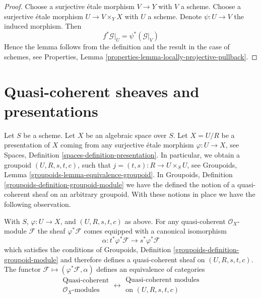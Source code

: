 \begin{proof}
Choose a surjective \'etale morphism $V \to Y$ with $V$ a scheme.
Choose a surjective \'etale morphism $U \to V \times_Y X$ with
$U$ a scheme. Denote $\psi : U \to V$ the induced morphism.
Then
$$
f^*\mathcal{G}|_U = \psi^*(\mathcal{G}|_V)
$$
Hence the lemma follows from the definition and the result in the
case of schemes, see
Properties, Lemma \ref{properties-lemma-locally-projective-pullback}.
\end{proof}





\section{Quasi-coherent sheaves and presentations}
\label{section-quasi-coherent-presentation}

\noindent
Let $S$ be a scheme. Let $X$ be an algebraic space over $S$.
Let $X = U/R$ be a presentation of $X$ coming from any surjective
\'etale morphism $\varphi : U \to X$, see
Spaces, Definition \ref{spaces-definition-presentation}.
In particular, we obtain a groupoid $(U, R, s, t, c)$, such that
$j = (t, s) : R \to U \times_S U$, see
Groupoids, Lemma \ref{groupoids-lemma-equivalence-groupoid}.
In
Groupoids, Definition \ref{groupoids-definition-groupoid-module}
we have the defined the notion of a quasi-coherent sheaf
on an arbitrary groupoid. With these notions in place we have
the following observation.

\begin{proposition}
\label{proposition-quasi-coherent}
With $S$, $\varphi : U \to X$, and $(U, R, s, t, c)$ as above.
For any quasi-coherent $\mathcal{O}_X$-module $\mathcal{F}$ the
sheaf $\varphi^*\mathcal{F}$ comes equipped with a canonical
isomorphism
$$
\alpha : t^*\varphi^*\mathcal{F} \longrightarrow s^*\varphi^*\mathcal{F}
$$
which satisfies the conditions of 
Groupoids, Definition \ref{groupoids-definition-groupoid-module}
and therefore defines a quasi-coherent sheaf on $(U, R, s, t, c)$.
The functor $\mathcal{F} \mapsto (\varphi^*\mathcal{F}, \alpha)$
defines an equivalence of categories
$$
\begin{matrix}
\text{Quasi-coherent} \\
\mathcal{O}_X\text{-modules}
\end{matrix}
\longleftrightarrow
\begin{matrix}
\text{Quasi-coherent modules}\\
\text{on }(U, R, s, t, c)
\end{matrix}
$$
\end{proposition}

